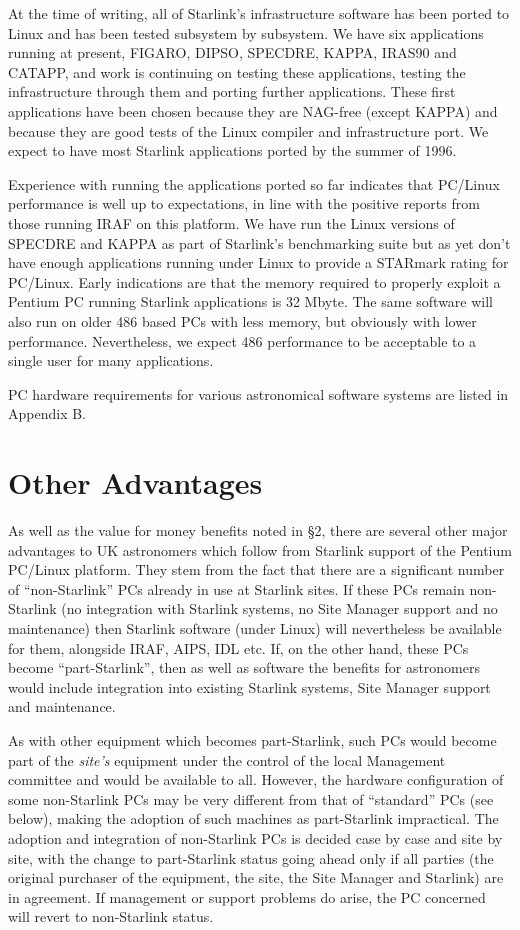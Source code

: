 At the time of writing, all of Starlink's infrastructure software has
been ported to Linux and has been tested subsystem by subsystem.  We
have six applications running at present, FIGARO, DIPSO, SPECDRE, KAPPA,
IRAS90 and
CATAPP, and work is continuing on testing these applications, testing
the infrastructure through them and porting further applications.
These first applications have been chosen because they
are NAG-free (except KAPPA) and because they are good tests of the
Linux compiler and infrastructure port. We expect to have most
Starlink applications ported by the summer of 1996.

Experience with running the applications ported so far indicates that
PC/Linux performance is well up to expectations, in line with the
positive reports from those running IRAF on this platform.  We have run
the Linux versions of SPECDRE and KAPPA as part of Starlink's
benchmarking suite but as yet don't have enough applications running
under Linux to provide a STARmark rating for PC/Linux.  Early
indications are that the memory required to properly exploit a Pentium
PC running Starlink applications is 32 Mbyte.  The same software will
also run on older 486 based PCs with less memory, but obviously with
lower performance. Nevertheless, we expect 486 performance to be
acceptable to a single user for many applications.

PC hardware requirements for various astronomical software systems are
listed in Appendix B. 

\section{Other Advantages}

As well as the value for money benefits noted in \S 2, there are
several other major advantages to UK astronomers which follow from
Starlink support of the Pentium PC/Linux platform.  They stem from the
fact that there are a significant number of ``non-Starlink'' PCs
already in use at Starlink sites.   If these PCs remain non-Starlink
(no integration with Starlink systems, no Site Manager support and no
maintenance) then Starlink software (under Linux) will nevertheless be
available for them, alongside IRAF, AIPS, IDL etc.   If, on the other
hand, these PCs become ``part-Starlink'', then as well as software the
benefits for astronomers would include integration into existing
Starlink systems, Site Manager support and maintenance.

As with other equipment which becomes part-Starlink, such PCs would
become part of the {\em site's} equipment under the control of the
local Management committee and would be available to
all.  However, the hardware configuration of some non-Starlink PCs may
be very different from that of ``standard'' PCs (see below), making the
adoption of such machines as part-Starlink impractical.  The
adoption and integration of non-Starlink PCs is decided case by case
and site by site, with the change to part-Starlink status going ahead
only if all parties (the original purchaser of the equipment, the site,
the Site Manager and Starlink) are in agreement.   If management or
support problems do arise, the PC concerned will revert to
non-Starlink status.

